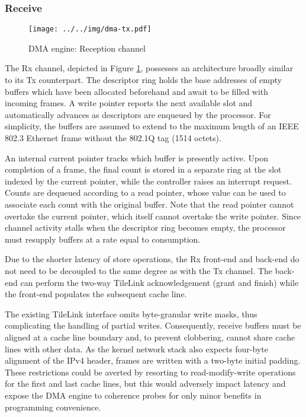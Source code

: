 \subsubsection{Receive}

\begin{figure}[t]
\begin{center}
\label{fig:dma-rx}
\texttt{[image: ../../img/dma-tx.pdf]}
\caption{DMA engine: Reception channel}
\end{center}
\end{figure}

The Rx channel, depicted in Figure \ref{fig:dma-rx}, possesses an
architecture broadly similar to its Tx counterpart.
The descriptor ring holds the base addresses of empty buffers which have
been allocated beforehand and await to be filled with incoming frames.
A write pointer reports the next available slot and automatically
advances as descriptors are enqueued by the processor.
For simplicity, the buffers are assumed to extend to the maximum length
of an IEEE 802.3 Ethernet frame without the 802.1Q tag (1514 octets).

An internal current pointer tracks which buffer is presently active.
Upon completion of a frame, the final count is stored in a separate ring
at the slot indexed by the current pointer, while the controller raises
an interrupt request.
Counts are dequeued according to a read pointer, whose value can be used
to associate each count with the original buffer.
Note that the read pointer cannot overtake the current pointer, which
itself cannot overtake the write pointer.
Since channel activity stalls when the descriptor ring becomes empty,
the processor must resupply buffers at a rate equal to consumption.

Due to the shorter latency of store operations, the Rx front-end and
back-end do not need to be decoupled to the same degree as with the Tx
channel.
The back-end can perform the two-way TileLink acknowledgement (grant and
finish) while the front-end populates the subsequent cache line.

The existing TileLink interface omits byte-granular write masks, thus
complicating the handling of partial writes.
Consequently, receive buffers must be aligned at a cache line boundary
and, to prevent clobbering, cannot share cache lines with other data.
As the kernel network stack also expects four-byte alignment of the IPv4
header, frames are written with a two-byte initial padding.
These restrictions could be averted by resorting to read-modify-write
operations for the first and last cache lines, but this would adversely
impact latency and expose the DMA engine to coherence probes for only
minor benefits in programming convenience.
